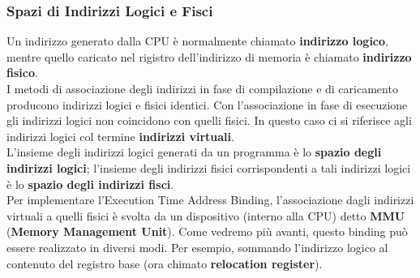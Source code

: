 \documentclass{article}
\begin{document}
			\subsubsection{Spazi di Indirizzi Logici e Fisci}
				Un indirizzo generato dalla CPU è normalmente chiamato \textbf{indirizzo logico}, mentre quello caricato nel rigistro dell'indirizzo di memoria è chiamato \textbf{indirizzo fisico}.	
				\\I metodi di associazione degli indirizzi in fase di compilazione e di caricamento producono indirizzi logici e fisici identici. Con l'associazione in fase di esecuzione gli indirizzi logici non coincidono con quelli fisici. In questo caso ci si riferisce agli indirizzi logici col termine \textbf{indirizzi virtuali}.
				\\L'insieme degli indirizzi logici generati da un programma è lo \textbf{spazio degli indirizzi logici}; l'insieme degli indirizzi fisici corrispondenti a tali indirizzi logici è lo \textbf{spazio degli indirizzi fisci}.
				\\Per implementare l'Execution Time Address Binding,  l'associazione dagli indirizzi virtuali a quelli fisici è svolta da un dispositivo (interno alla CPU) detto \textbf{MMU} (\textbf{Memory Management Unit}). Come vedremo più avanti, questo binding può essere realizzato in diversi modi. Per esempio, sommando l'indirizzo logico al contenuto del registro base (ora chimato \textbf{relocation register}).
				\begin{figure}[ht!]
				\end{figure}
\end{document}
